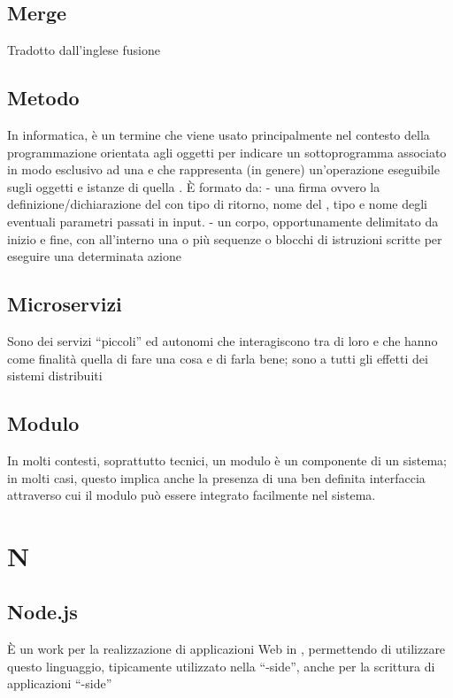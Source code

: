 {{		\subsection{Merge}
		Tradotto dall'inglese fusione


		\subsection{Metodo}
		In informatica, è un termine che viene usato principalmente nel contesto della programmazione orientata agli oggetti per indicare un sottoprogramma associato in modo esclusivo ad una  e che rappresenta (in genere) un'operazione eseguibile sugli oggetti e istanze di quella .
È formato da:
- una firma ovvero la definizione/dichiarazione del  con tipo di ritorno, nome del , tipo e nome degli eventuali parametri passati in input.
- un corpo, opportunamente delimitato da inizio e fine, con all'interno una o più sequenze o blocchi di istruzioni scritte per eseguire una determinata azione



		\subsection{Microservizi}
		Sono dei servizi “piccoli” ed autonomi che interagiscono tra di loro e che hanno come finalità quella di fare una cosa e di farla bene; sono a tutti gli effetti dei sistemi distribuiti


		\subsection{Modulo}
		In molti contesti, soprattutto tecnici, un modulo è un componente di un sistema; in molti casi, questo implica anche la presenza di una ben definita interfaccia attraverso cui il modulo può essere integrato facilmente nel sistema.


\section{N}
		\subsection{Node.js}
		È un work per la realizzazione di applicazioni Web in , permettendo di utilizzare questo linguaggio, tipicamente utilizzato nella “-side”, anche per la scrittura di applicazioni “-side”


}}
